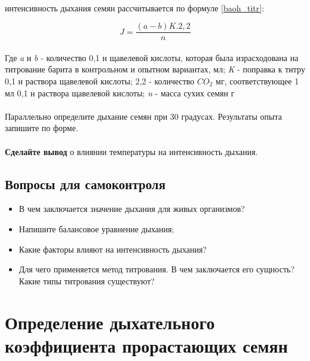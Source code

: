 \paragraph*{}интенсивность дыхания семян рассчитывается по формуле \ref{baoh_titr}:

\begin{equation}
	\label{baoh_titr}
	J = \frac{(a-b)K.2,2}{n}
\end{equation}

\paragraph*{}Где \textit{a} и \textit{b} - количество 0,1 н щавелевой кислоты, которая была израсходована на титрование барита в контрольном и опытном вариантах, мл; \textit{K} - поправка к титру 0,1 н раствора щавелевой кислоты; 2,2 - количество $CO_2$ мг, соответствующее 1 мл 0,1 н раствора щавелевой кислоты; \textit{n} - масса сухих семян г 

\paragraph*{}Параллельно определите дыхание семян при 30 градусах. Результаты опыта запишите по форме.

\paragraph*{}\textbf{Сделайте вывод} о влиянии температуры на интенсивность дыхания.

\subsection*{Вопросы для самоконтроля}

	\begin{itemize}
		\item В чем заключается значение дыхания для живых организмов?
		\item Напишите балансовое уравнение дыхания;
		\item Какие факторы влияют на интенсивность дыхания?
		\item Для чего применяется метод титрования. В чем заключается его сущность? Какие типы титрования существуют?
		
	\end{itemize}
	
\section*{\lbtitle Определение дыхательного коэффициента прорастающих семян}

